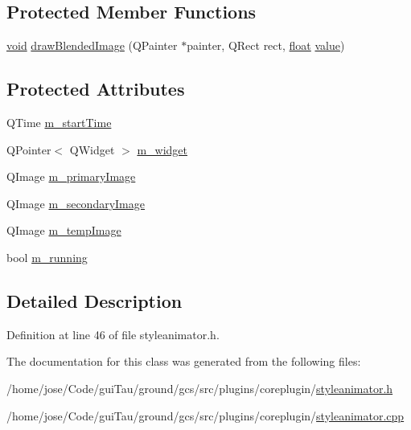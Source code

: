 \subsection*{Protected Member Functions}
\begin{DoxyCompactItemize}
\item 
\hyperlink{group___u_a_v_objects_plugin_ga444cf2ff3f0ecbe028adce838d373f5c}{void} \hyperlink{group___core_plugin_ga103d41217066f9b6877a6c83e493f546}{draw\-Blended\-Image} (Q\-Painter $\ast$painter, Q\-Rect rect, \hyperlink{_super_l_u_support_8h_a6a1bb6ed41f44b60e7bd83b0e9945aa7}{float} \hyperlink{glext_8h_aa0e2e9cea7f208d28acda0480144beb0}{value})
\end{DoxyCompactItemize}
\subsection*{Protected Attributes}
\begin{DoxyCompactItemize}
\item 
Q\-Time \hyperlink{group___core_plugin_gab32f9df13e3d8f25c36459622310803b}{m\-\_\-start\-Time}
\item 
Q\-Pointer$<$ Q\-Widget $>$ \hyperlink{group___core_plugin_ga93de3ff345a140e523056a0ccb332f3b}{m\-\_\-widget}
\item 
Q\-Image \hyperlink{group___core_plugin_gafa890764761bd5b4427837a59aa5074c}{m\-\_\-primary\-Image}
\item 
Q\-Image \hyperlink{group___core_plugin_ga75f12d898f20a6f11f71abe32ba0798d}{m\-\_\-secondary\-Image}
\item 
Q\-Image \hyperlink{group___core_plugin_ga7df3423cfde9af76852c271e0fe37991}{m\-\_\-temp\-Image}
\item 
bool \hyperlink{group___core_plugin_gaff01511bc96b0109ced0a5a4b788f7b0}{m\-\_\-running}
\end{DoxyCompactItemize}


\subsection{Detailed Description}


Definition at line 46 of file styleanimator.\-h.



The documentation for this class was generated from the following files\-:\begin{DoxyCompactItemize}
\item 
/home/jose/\-Code/gui\-Tau/ground/gcs/src/plugins/coreplugin/\hyperlink{styleanimator_8h}{styleanimator.\-h}\item 
/home/jose/\-Code/gui\-Tau/ground/gcs/src/plugins/coreplugin/\hyperlink{styleanimator_8cpp}{styleanimator.\-cpp}\end{DoxyCompactItemize}
